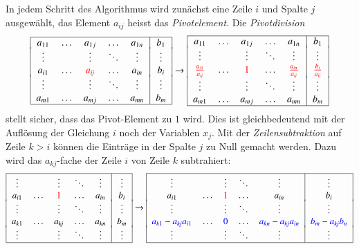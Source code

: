 In jedem Schritt des Algorithmus wird zunächst eine Zeile $i$ und
Spalte $j$ ausgewählt, das Element $a_{i\!j}$ heisst das {\em Pivotelement}.
%
Die {\em Pivotdivision}
\[
\begin{tabular}{|>{$}c<{$}>{$}c<{$}>{$}c<{$}>{$}c<{$}>{$}c<{$}|>{$}c<{$}|}
\hline
a_{11}&\dots &a_{1j}&\dots &a_{1n}&b_1   \\[-2pt]
\vdots&      &\vdots&\ddots&\vdots&\vdots\\
a_{i1}&\dots &{\color{red}a_{i\!j}}&\dots &a_{in}&b_i   \\[-2pt]
\vdots&      &\vdots&\ddots&\vdots&\vdots\\
a_{m1}&\dots &a_{mj}&\dots &a_{mn}&b_m   \\
\hline
\end{tabular}
\rightarrow
\begin{tabular}{|>{$}c<{$}>{$}c<{$}>{$}c<{$}>{$}c<{$}>{$}c<{$}|>{$}c<{$}|}
\hline
a_{11}&\dots &a_{1j}&\dots &a_{1n}&b_1   \\[-2pt]
\vdots&      &\vdots&\ddots&\vdots&\vdots\\
{\color{red}\frac{a_{i1}}{a_{i\!j}}}&\dots &{\color{red}1}&\dots &{\color{red}\frac{a_{in}}{a_{i\!j}}}&{\color{red}\frac{b_i}{a_{i\!j}}}\\[-2pt]
\vdots&      &\vdots&\ddots&\vdots&\vdots\\
a_{m1}&\dots &a_{mj}&\dots &a_{mn}&b_m   \\
\hline
\end{tabular}
\]
stellt sicher, dass das Pivot-Element zu $1$ wird.
Dies ist gleichbedeutend mit der Auflösung der Gleichung $i$ noch der
Variablen $x_j$.
Mit der {\em Zeilensubtraktion} auf Zeile $k>i$ können die Einträge in der
%
Spalte $j$ zu Null gemacht werden.
Dazu wird das $a_{k\!j}$-fache der Zeile $i$ von Zeile $k$ subtrahiert:
\[
\begin{tabular}{|>{$}c<{$}>{$}c<{$}>{$}c<{$}>{$}c<{$}>{$}c<{$}|>{$}c<{$}|}
\hline
\vdots&      &\vdots&\ddots&\vdots&\vdots\\
a_{i1}&\dots &{\color{red}1}&\dots &a_{in}&b_i   \\[-2pt]
\vdots&      &\vdots&\ddots&\vdots&\vdots\\
a_{k1}&\dots &a_{k\!j}&\dots &a_{kn}&b_m   \\[-2pt]
\vdots&      &\vdots&\ddots&\vdots&\vdots\\
\hline
\end{tabular}
\rightarrow
\begin{tabular}{|>{$}c<{$}>{$}c<{$}>{$}c<{$}>{$}c<{$}>{$}c<{$}|>{$}c<{$}|}
\hline
\vdots&      &\vdots&\ddots&\vdots&\vdots\\
a_{i1}&\dots &{\color{red}1}&\dots &a_{in}&b_i   \\[-2pt]
\vdots&      &\vdots&\ddots&\vdots&\vdots\\
{\color{blue}a_{k1}-a_{k\!j}a_{i1}}&\dots &{\color{blue}0}&\dots &{\color{blue}a_{kn}-a_{k\!j}a_{in}}&{\color{blue}b_m-a_{k\!j}b_{n}}\\[-2pt]
\vdots&      &\vdots&\ddots&\vdots&\vdots\\
\hline
\end{tabular}
\]
